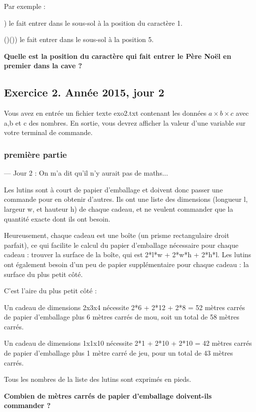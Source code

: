 Par exemple :

    ) le fait entrer dans le sous-sol à la position du caractère 1.
    
    ()()) le fait entrer dans le sous-sol à la position 5.
    
\textbf{    Quelle est la position du caractère qui fait entrer le Père Noël en premier dans la cave ?
}    

\subsection{Exercice 2. Année 2015, jour 2}

Vous avez en entrée un fichier texte exo2.txt contenant les données $a \times b \times c$ avec a,b et c des nombres.
En sortie, vous devrez afficher la valeur d'une variable sur votre terminal de commande.


\subsubsection{première partie}

--- Jour 2 : On m'a dit qu'il n'y aurait pas de maths...

Les lutins sont à court de papier d'emballage et doivent donc passer une commande pour en obtenir d'autres. Ils ont une liste des dimensions (longueur l, largeur w, et hauteur h) de chaque cadeau, et ne veulent commander que la quantité exacte dont ils ont besoin.

Heureusement, chaque cadeau est une boîte (un prisme rectangulaire droit parfait), ce qui facilite le calcul du papier d'emballage nécessaire pour chaque cadeau : trouver la surface de la boîte, qui est 2*l*w + 2*w*h + 2*h*l. Les lutins ont également besoin d'un peu de papier supplémentaire pour chaque cadeau : la surface du plus petit côté.

C'est l'aire du plus petit côté :

    Un cadeau de dimensions 2x3x4 nécessite 2*6 + 2*12 + 2*8 = 52 mètres carrés de papier d'emballage plus 6 mètres carrés de mou, soit un total de 58 mètres carrés.

    Un cadeau de dimensions 1x1x10 nécessite 2*1 + 2*10 + 2*10 = 42 mètres carrés de papier d'emballage plus 1 mètre carré de jeu, pour un total de 43 mètres carrés.

Tous les nombres de la liste des lutins sont exprimés en pieds. 

\textbf{Combien de mètres carrés de papier d'emballage doivent-ils commander ?}

